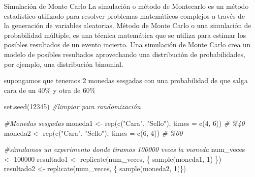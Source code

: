 \documentclass[
  8pt,
  ignorenonframetext,
]{beamer}
\newenvironment{Shaded}{\begin{snugshade}}{\end{snugshade}}
\newcommand{\AttributeTok}[1]{\textcolor[rgb]{0.77,0.63,0.00}{#1}}
\newcommand{\CommentTok}[1]{\textcolor[rgb]{0.56,0.35,0.01}{\textit{#1}}}
\newcommand{\DecValTok}[1]{\textcolor[rgb]{0.00,0.00,0.81}{#1}}
\newcommand{\FunctionTok}[1]{\textcolor[rgb]{0.00,0.00,0.00}{#1}}
\newcommand{\NormalTok}[1]{#1}
\newcommand{\OtherTok}[1]{\textcolor[rgb]{0.56,0.35,0.01}{#1}}
\newcommand{\StringTok}[1]{\textcolor[rgb]{0.31,0.60,0.02}{#1}}
\begin{document}
\begin{frame}[fragile]{Simulación de Monte Carlo}
\protect\hypertarget{simulaciuxf3n-de-monte-carlo}{}
La simulación o método de Montecarlo es un método estadístico utilizado
para resolver problemas matemáticos complejos a través de la generación
de variables aleatorias. Método de Monte Carlo o una simulación de
probabilidad múltiple, es una técnica matemática que se utiliza para
estimar los posibles resultados de un evento incierto. Una simulación de
Monte Carlo crea un modelo de posibles resultados aprovechando una
distribución de probabilidades, por ejemplo, una distribución binomial.

supongamos que tenemos 2 monedas sesgadas con una probabilidad de que
salga cara de un 40\% y otra de 60\%

\begin{Shaded}
\begin{Highlighting}[]
\FunctionTok{set.seed}\NormalTok{(}\DecValTok{12345}\NormalTok{) }\CommentTok{\#limpiar para randomización}

\CommentTok{\#Monedas sesgadas}
\NormalTok{moneda1 }\OtherTok{\textless{}{-}} \FunctionTok{rep}\NormalTok{(}\FunctionTok{c}\NormalTok{(}\StringTok{"Cara"}\NormalTok{, }\StringTok{"Sello"}\NormalTok{), }\AttributeTok{times =} \FunctionTok{c}\NormalTok{(}\DecValTok{4}\NormalTok{, }\DecValTok{6}\NormalTok{)) }\CommentTok{\# \%40}
\NormalTok{moneda2 }\OtherTok{\textless{}{-}} \FunctionTok{rep}\NormalTok{(}\FunctionTok{c}\NormalTok{(}\StringTok{"Cara"}\NormalTok{, }\StringTok{"Sello"}\NormalTok{), }\AttributeTok{times =} \FunctionTok{c}\NormalTok{(}\DecValTok{6}\NormalTok{, }\DecValTok{4}\NormalTok{)) }\CommentTok{\# \%60}

\CommentTok{\#simulamos un experimento donde tiramos 100000 veces la moneda}
\NormalTok{num\_veces }\OtherTok{\textless{}{-}} \DecValTok{100000} 
\NormalTok{resultado1 }\OtherTok{\textless{}{-}} \FunctionTok{replicate}\NormalTok{(num\_veces, \{}
  \FunctionTok{sample}\NormalTok{(moneda1, }\DecValTok{1}\NormalTok{) \})}
\NormalTok{resultado2 }\OtherTok{\textless{}{-}} \FunctionTok{replicate}\NormalTok{(num\_veces, \{}
  \FunctionTok{sample}\NormalTok{(moneda2, }\DecValTok{1}\NormalTok{)\})}
\end{Highlighting}
\end{Shaded}
\end{frame}
\end{document}
